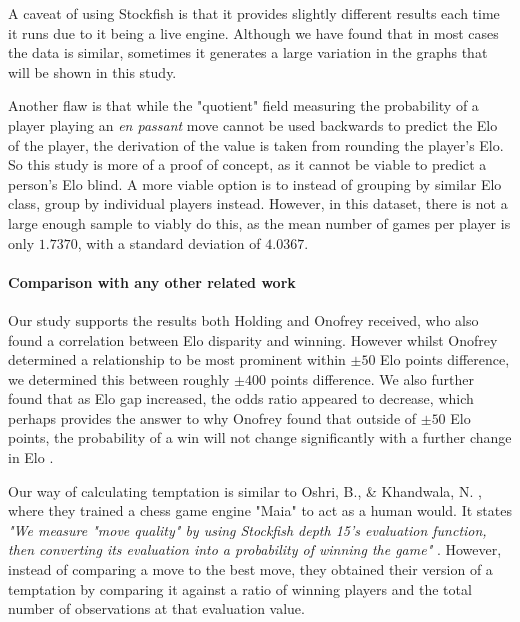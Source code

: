 \documentclass[10pt,a4paper]{article}
\begin{document}
\begin{multicols}{2}
A caveat of using Stockfish is that it provides slightly different results each time it runs due to it being a live engine. Although we have found that in most cases the data is similar, sometimes it generates a large variation in the graphs that will be shown in this study.\newline

Another flaw is that while the "quotient"  field measuring the probability of a player playing an \textit{en passant} move cannot be used backwards to predict the Elo of the player, the derivation of the value is taken from rounding the player's Elo. So this study is more of a proof of concept, as it cannot be viable to predict a person's Elo blind. A more viable option is to instead of grouping by similar Elo class, group by individual players instead. However, in this dataset, there is not a large enough sample to viably do this, as the mean number of games per player is only $1.7370$, with a standard deviation of $4.0367$.


\paragraph{Comparison with any other related work}
Our study supports the results both Holding \cite{PsychologyOfChessSkill} and Onofrey \cite{HowMuchDoesEloMatter} received, who also found a correlation between Elo disparity and winning. However whilst Onofrey \cite{HowMuchDoesEloMatter} determined a relationship to be most prominent within $\pm 50$ Elo points difference, we determined this between roughly $\pm 400$ points difference. We also further found that as Elo gap increased, the odds ratio appeared to decrease, which perhaps provides the answer to why Onofrey found that outside of $\pm 50$ Elo points, the
probability of a win will not change significantly with a further change in Elo \cite{HowMuchDoesEloMatter}. \newline

Our way of calculating temptation is similar to Oshri, B., \& Khandwala, N. \cite{mcilroy2020aligning}, where they trained a chess game engine "Maia" to act as a human would. It states \textit{"We measure "move quality" by using Stockfish depth 15's evaluation function, then converting its evaluation into a probability of winning the game"} \cite{mcilroy2020aligning}. However, instead of comparing a move to the best move, they obtained their version of a temptation by comparing it against a ratio of winning players and the total number of observations at that evaluation value.




\end{multicols}
\end{document}
